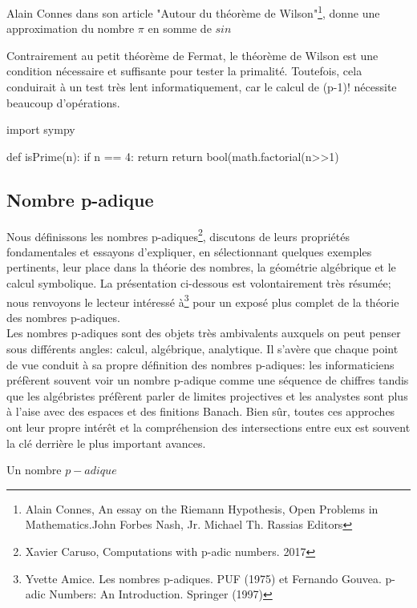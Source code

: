 Alain Connes dans son article "Autour du théorème de Wilson"\footnote{Alain Connes, An essay on the Riemann Hypothesis, Open Problems in Mathematics.John Forbes Nash, Jr. Michael Th. Rassias Editors}, donne une approximation du nombre $\pi$ en somme de $sin$
\begin{remark}
Contrairement au petit théorème de Fermat, le théorème de Wilson est une condition nécessaire et suffisante pour tester la primalité. Toutefois, cela conduirait à un test très lent informatiquement, car le calcul de (p-1)! nécessite beaucoup d'opérations.
\end{remark}
\begin{python}
import sympy

def isPrime(n):
 if n == 4: return 
 return bool(math.factorial(n>>1)%
\end{python}
\subsection{Nombre p-adique}
Nous définissons les nombres p-adiques\footnote{Xavier Caruso, Computations with p-adic numbers. 2017}, discutons de leurs propriétés fondamentales et essayons d'expliquer, en sélectionnant quelques exemples pertinents, leur place dans la théorie des nombres, la géométrie algébrique et le calcul symbolique. La présentation ci-dessous est volontairement très résumée; nous renvoyons le lecteur intéressé à\footnote{Yvette Amice. Les nombres p-adiques. PUF (1975) et Fernando Gouvea. p-adic Numbers: An Introduction. Springer (1997) } pour un exposé plus complet de la théorie des nombres p-adiques.
\\
Les nombres p-adiques sont des objets très ambivalents auxquels on peut penser sous différents angles:
calcul, algébrique, analytique. Il s'avère que chaque point de vue conduit à sa propre définition
des nombres p-adiques: les informaticiens préfèrent souvent voir un nombre p-adique comme une séquence de
chiffres tandis que les algébristes préfèrent parler de limites projectives et les analystes sont plus à l'aise
avec des espaces et des finitions Banach. Bien sûr, toutes ces approches ont leur propre intérêt
et la compréhension des intersections entre eux est souvent la clé derrière le plus important
avances.
\begin{definition}
Un nombre $p-adique$
\end{definition}
